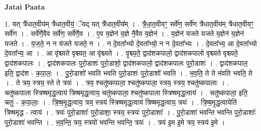 \documentclass[17pt]{extarticle}
\begin{document}
\textbf{Jatai Paata} \newline

1. यत् त्रै॑धात॒वीय॑म् त्रैधात॒वीयं॒ ॅयद् यत् त्रै॑धात॒वीय᳚म् । . त्रै॒धा॒त॒वीयꣳ॒॒ सर्वे॑ण॒ सर्वे॑ण त्रैधात॒वीय॑म् त्रैधात॒वीयꣳ॒॒ सर्वे॑ण । . सर्वे॑णै॒वैव सर्वे॑ण॒ सर्वे॑णै॒व । . ए॒व य॒ज्ञेन॑ य॒ज्ञे नै॒वैव य॒ज्ञेन॑ । . य॒ज्ञेन॑ यजते यजते य॒ज्ञेन॑ य॒ज्ञेन॑ यजते । . य॒ज॒ते॒ न न य॑जते यजते॒ न । . न दे॒वता᳚भ्यो दे॒वता᳚भ्यो॒ न न दे॒वता᳚भ्यः । . दे॒वता᳚भ्य॒ आ दे॒वता᳚भ्यो दे॒वता᳚भ्य॒ आ । . आ वृ॑श्च्यते वृश्च्यत॒ आ वृ॑श्च्यते । . वृ॒श्च्य॒ते॒ द्वाद॑शकपालो॒ द्वाद॑शकपालो वृश्च्यते वृश्च्यते॒ द्वाद॑शकपालः । . द्वाद॑शकपालः पुरो॒डाशः॑ पुरो॒डाशो॒ द्वाद॑शकपालो॒ द्वाद॑शकपालः पुरो॒डाशः॑ । . द्वाद॑शकपाल॒ इति॒ द्वाद॑श - क॒पा॒लः॒ । . पु॒रो॒डाशो॑ भवति भवति पुरो॒डाशः॑ पुरो॒डाशो॑ भवति । . भ॒व॒ति॒ ते ते भ॑वति भवति॒ ते । . ते त्रय॒ स्त्रय॒ स्ते ते त्रयः॑ । . त्रय॒ श्चतु॑ष्कपाला॒ श्चतु॑ष्कपाला॒ स्त्रय॒ स्त्रय॒ श्चतु॑ष्कपालाः । . चतु॑ष्कपाला स्त्रिष्षमृद्ध॒त्वाय॑ त्रिष्षमृद्ध॒त्वाय॒ चतु॑ष्कपाला॒ श्चतु॑ष्कपाला स्त्रिष्षमृद्ध॒त्वाय॑ । . चतु॑ष्कपाला॒ इति॒ चतुः॑ - क॒पा॒लाः॒ । . त्रि॒ष्ष॒मृ॒द्ध॒त्वाय॒ त्रय॒ स्त्रय॑ स्त्रिष्षमृद्ध॒त्वाय॑ त्रिष्षमृद्ध॒त्वाय॒ त्रयः॑ । . त्रि॒ष्ष॒मृ॒द्ध॒त्वायेति॑ त्रिष्षमृद्ध - त्वाय॑ । . त्रयः॑ पुरो॒डाशाः᳚ पुरो॒डाशा॒ स्त्रय॒ स्त्रयः॑ पुरो॒डाशाः᳚ । . पु॒रो॒डाशा॑ भवन्ति भवन्ति पुरो॒डाशाः᳚ पुरो॒डाशा॑ भवन्ति । . भ॒व॒न्ति॒ त्रय॒ स्त्रयो॑ भवन्ति भवन्ति॒ त्रयः॑ । . त्रय॑ इ॒म इ॒मे त्रय॒ स्त्रय॑ इ॒मे । \newline
\end{document}
